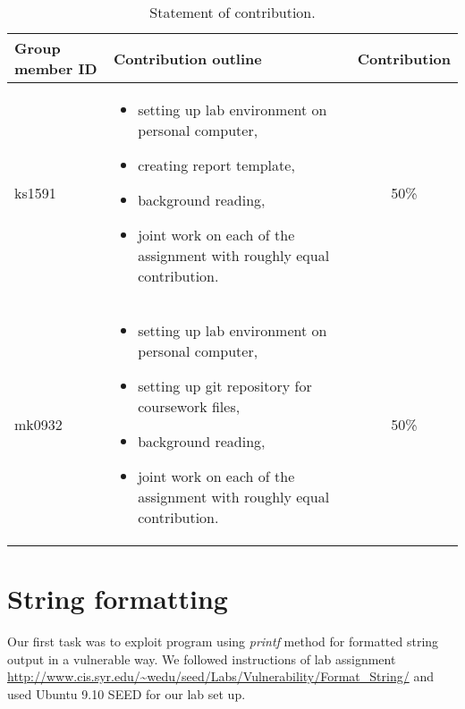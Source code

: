 \documentclass[12pt, a4paper, pdflatex]{article}
\begin{document}
\begin{center}
  \begin{table}[h]
    \begin{tabular}{ l | p{8.5cm} | c }
      Group member ID & Contribution outline & Contribution \\
      \hline
      ks1591 &
      \begin{itemize}
        \item setting up lab environment on personal computer,
        \item creating report template,
        \item background reading,
        \item joint work on each of the assignment with roughly equal contribution.
      \end{itemize}
      & 50\% \\
      mk0932 &
      \begin{itemize}
        \item setting up lab environment on personal computer,
        \item setting up git repository for coursework files,
        \item background reading,
        \item joint work on each of the assignment with roughly equal contribution.
      \end{itemize}
      & 50\% \\
    \end{tabular}
    \caption{Statement of contribution.\label{tab:SoC}}
  \end{table}
\end{center}

\section{String formatting}

Our first task was to exploit program using \emph{printf} method for formatted string output in a vulnerable way. We followed instructions of lab assignment  \url{http://www.cis.syr.edu/~wedu/seed/Labs/Vulnerability/Format_String/}
and used Ubuntu 9.10 SEED for our lab set up.
\end{document}
